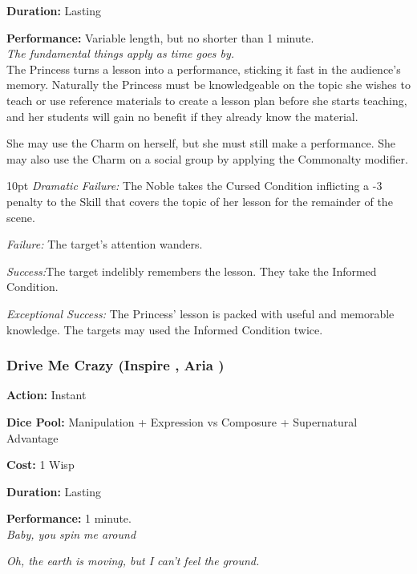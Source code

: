\noindent \textbf{Duration:} Lasting

\noindent \textbf{Performance:} Variable length, but no shorter than 1 minute. \\ 

\textit{The fundamental things apply as time goes by.} \\

\noindent The Princess turns a lesson into a performance, sticking it fast in the audience's memory. Naturally the Princess must be knowledgeable on the topic she wishes to teach or use reference materials to create a lesson plan before she starts teaching, and her students will gain no benefit if they already know the material.

She may use the Charm on herself, but she must still make a performance. She may also use the Charm on a social group by applying the Commonalty modifier. 

\begin{myindentpar}{10pt}    \emph{Dramatic Failure:} The Noble takes the Cursed Condition inflicting a -3 penalty to the Skill that covers the topic of her lesson for the remainder of the scene.

    \emph{Failure:} The target’s attention wanders.

    \emph{Success:}The target indelibly remembers the lesson. They take the Informed Condition. 

    \emph{Exceptional Success:} The Princess' lesson is packed with useful and memorable knowledge. The targets may used the Informed Condition twice. 

\end{myindentpar}

\subsubsection*{Drive Me Crazy (Inspire \textbullet\textbullet, Aria \textbullet)}

\noindent \textbf{Action:} Instant 

\noindent \textbf{Dice Pool:} Manipulation + Expression vs Composure + Supernatural Advantage

\noindent \textbf{Cost:} 1 Wisp

\noindent \textbf{Duration:} Lasting

\noindent \textbf{Performance:} 1 minute. \\ 

\textit{Baby, you spin me around}

\textit{Oh, the earth is moving, but I can't feel the ground.} \\

